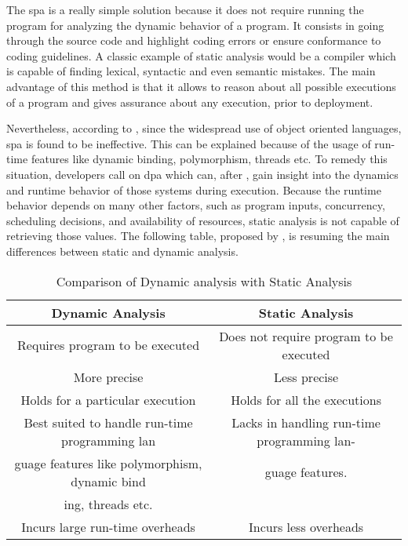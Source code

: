 The \gls{spa} is a really simple solution because it does not require running the program for analyzing the dynamic behavior of a program. It consists in going through the source code and highlight coding errors or ensure conformance to coding guidelines. A classic example of static analysis would be a compiler which is capable of finding lexical, syntactic and even semantic mistakes. The main advantage of this method is that it allows to reason about all possible executions of a program and gives assurance about any execution, prior to deployment. 

Nevertheless, according to \cite{Gosain2015}, since the widespread use of object oriented languages, \gls{spa} is found to be ineffective. This can be explained because of the usage of run-time features like dynamic binding, polymorphism, threads etc. To remedy this situation, developers call on \gls{dpa} which can, after \cite{Marek2015100}, gain insight into the dynamics and runtime behavior of those systems during execution. Because the runtime behavior depends on many other factors, such as program inputs, concurrency, scheduling decisions, and availability of resources, static analysis is not capable of retrieving those values. The following table, proposed by \cite{Gosain2015}, is resuming the main differences between static and dynamic analysis.

\bigskip

\begin{table}[htb]
\begin{center}
\begin{tabulary}{\textwidth}{CC}
  \hline
  Dynamic Analysis 	& Static Analysis \\\hline
  Requires program to be executed	& Does not require program to be executed \\
  More precise & Less precise \\
  Holds for a particular execution & Holds for all the executions \\
  Best suited to handle run-time programming lan & Lacks in handling run-time programming lan-\\
guage features like polymorphism, dynamic bind & guage features.\\
ing, threads etc. &  \\
  Incurs large run-time overheads & Incurs less overheads \\\hline
\end{tabulary}
\end{center}
\caption{Comparison of Dynamic analysis with Static Analysis}
\label{list:comparaison}
\end{table}

